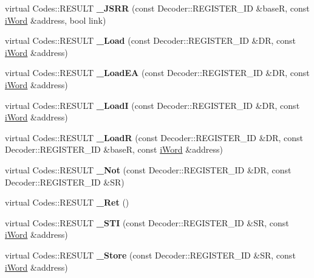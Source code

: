 \begin{DoxyCompactItemize}
\item 
\hypertarget{classWi11_a1237dd5c6468b287113a5d500bef9b3a}{
virtual Codes::RESULT {\bfseries \_\-JSRR} (const Decoder::REGISTER\_\-ID \&baseR, const \hyperlink{classiWord}{iWord} \&address, bool link)}
\label{classWi11_a1237dd5c6468b287113a5d500bef9b3a}

\item 
\hypertarget{classWi11_afb3e3507402d031a76b2e0bf3cc87b66}{
virtual Codes::RESULT {\bfseries \_\-Load} (const Decoder::REGISTER\_\-ID \&DR, const \hyperlink{classiWord}{iWord} \&address)}
\label{classWi11_afb3e3507402d031a76b2e0bf3cc87b66}

\item 
\hypertarget{classWi11_af8489eac0842d1a532be30ccc99f6f49}{
virtual Codes::RESULT {\bfseries \_\-LoadEA} (const Decoder::REGISTER\_\-ID \&DR, const \hyperlink{classiWord}{iWord} \&address)}
\label{classWi11_af8489eac0842d1a532be30ccc99f6f49}

\item 
\hypertarget{classWi11_a671e0d7845b262149005cd834cf28c31}{
virtual Codes::RESULT {\bfseries \_\-LoadI} (const Decoder::REGISTER\_\-ID \&DR, const \hyperlink{classiWord}{iWord} \&address)}
\label{classWi11_a671e0d7845b262149005cd834cf28c31}

\item 
\hypertarget{classWi11_a8ebf9deef5d86157aa1f4c01fe888a4f}{
virtual Codes::RESULT {\bfseries \_\-LoadR} (const Decoder::REGISTER\_\-ID \&DR, const Decoder::REGISTER\_\-ID \&baseR, const \hyperlink{classiWord}{iWord} \&address)}
\label{classWi11_a8ebf9deef5d86157aa1f4c01fe888a4f}

\item 
\hypertarget{classWi11_a82aa3fdb656277723b2c0937206ccdae}{
virtual Codes::RESULT {\bfseries \_\-Not} (const Decoder::REGISTER\_\-ID \&DR, const Decoder::REGISTER\_\-ID \&SR)}
\label{classWi11_a82aa3fdb656277723b2c0937206ccdae}

\item 
\hypertarget{classWi11_a8cbd4e75c8c10f69f4159c02955b4a1f}{
virtual Codes::RESULT {\bfseries \_\-Ret} ()}
\label{classWi11_a8cbd4e75c8c10f69f4159c02955b4a1f}

\item 
\hypertarget{classWi11_a466a425d5490850afc2f385b1ce47573}{
virtual Codes::RESULT {\bfseries \_\-STI} (const Decoder::REGISTER\_\-ID \&SR, const \hyperlink{classiWord}{iWord} \&address)}
\label{classWi11_a466a425d5490850afc2f385b1ce47573}

\item 
\hypertarget{classWi11_aeaafd928d0e450924a1b29fd3a6b828a}{
virtual Codes::RESULT {\bfseries \_\-Store} (const Decoder::REGISTER\_\-ID \&SR, const \hyperlink{classiWord}{iWord} \&address)}
\label{classWi11_aeaafd928d0e450924a1b29fd3a6b828a}


\end{DoxyCompactItemize}
